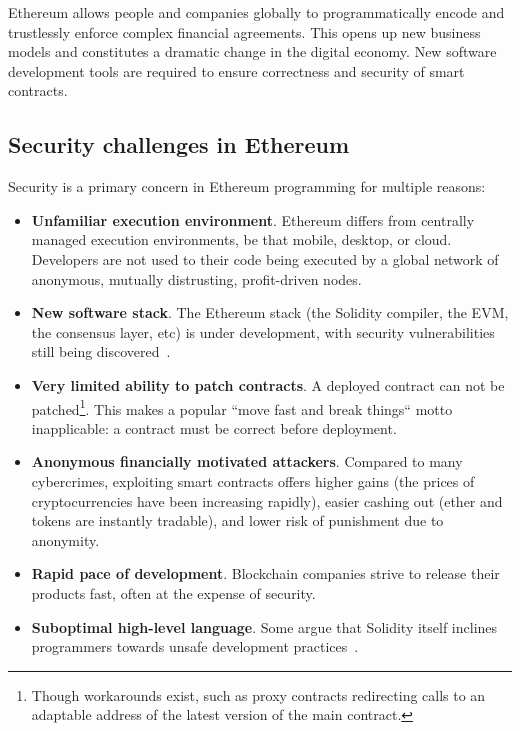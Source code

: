 Ethereum allows people and companies globally to programmatically encode and trustlessly enforce complex financial agreements.
This opens up new business models and constitutes a dramatic change in the digital economy.
New software development tools are required to ensure correctness and security of smart contracts.


\subsection{Security challenges in Ethereum} \label{SecurityChallenges}

Security is a primary concern in Ethereum programming for multiple reasons:
\begin{itemize}
	\item \textbf{Unfamiliar execution environment}.
	Ethereum differs from centrally managed execution environments, be that mobile, desktop, or cloud.
	Developers are not used to their code being executed by a global network of anonymous, mutually distrusting, profit-driven nodes.
	\item \textbf{New software stack}.
	The Ethereum stack (the Solidity compiler, the EVM, the consensus layer, etc) is under development, with security vulnerabilities still being discovered~\cite{chriseth2017}.
	\item \textbf{Very limited ability to patch contracts}.
	A deployed contract can not be patched\footnote{Though workarounds exist, such as proxy contracts redirecting calls to an adaptable address of the latest version of the main contract.}.
	This makes a popular ``move fast and break things`` motto inapplicable: a contract must be correct before deployment.
	\item \textbf{Anonymous financially motivated attackers}.
	Compared to many cybercrimes, exploiting smart contracts offers higher gains (the prices of cryptocurrencies have been increasing rapidly), easier cashing out (ether and tokens are instantly tradable), and lower risk of punishment due to anonymity.
	\item \textbf{Rapid pace of development}.
	Blockchain companies strive to release their products fast, often at the expense of security.
	\item \textbf{Suboptimal high-level language}.
	Some argue that Solidity itself inclines programmers towards unsafe development practices~\cite{ydtm2016}.
\end{itemize}

